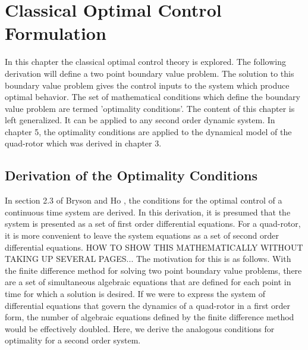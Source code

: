 
\chapter{Classical Optimal Control Formulation} %

\label{Chapter4} %


In this chapter the classical optimal control theory is explored. The following derivation will define a two point boundary value problem. The solution to this boundary value problem gives the control inputs to the system which produce optimal behavior. The set of mathematical conditions which define the boundary value problem are termed 'optimality conditions'. The content of this chapter is left generalized. It can be applied to any second order dynamic system. In chapter 5, the optimality conditions are applied to the dynamical model of the quad-rotor which was derived in chapter 3.


 


\section{Derivation of the Optimality Conditions}

    In section 2.3 of Bryson and Ho \cite{BrysonHo69}, the conditions for the optimal control of a continuous time system are derived. In this derivation, it is presumed that the system is  presented as a set of first order differential equations. For a quad-rotor, it is more convenient to leave the system equations as a set of second order differential equations. {\color{red} HOW TO SHOW THIS MATHEMATICALLY WITHOUT TAKING UP SEVERAL PAGES...} The motivation for this is as follows. With the finite difference method for solving two point boundary value problems, there are a set of simultaneous algebraic equations that are defined for each point in time for which a solution is desired. If we were to express the system of differential equations that govern the dynamics of a quad-rotor in a first order form, the number of algebraic equations defined by the finite difference method would be effectively doubled. Here, we derive the analogous conditions for optimality for a second order system.




